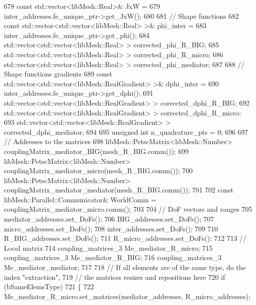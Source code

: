 \begin{DoxyCode}
678         \textcolor{keyword}{const} std::vector<libMesh::Real>& JxW =
679                 inter\_addresses.fe\_unique\_ptr->get\_JxW();
680 
681         \textcolor{comment}{// Shape functions}
682         \textcolor{keyword}{const} std::vector<std::vector<libMesh::Real> >& phi\_inter =
683                 inter\_addresses.fe\_unique\_ptr->get\_phi();
684         std::vector<std::vector<libMesh::Real> > corrected\_phi\_R\_BIG;
685         std::vector<std::vector<libMesh::Real> > corrected\_phi\_R\_micro;
686         std::vector<std::vector<libMesh::Real> > corrected\_phi\_mediator;
687 
688         \textcolor{comment}{// Shape functions gradients}
689         \textcolor{keyword}{const} std::vector<std::vector<libMesh::RealGradient> >& dphi\_inter =
690                 inter\_addresses.fe\_unique\_ptr->get\_dphi();
691         std::vector<std::vector<libMesh::RealGradient> > corrected\_dphi\_R\_BIG;
692         std::vector<std::vector<libMesh::RealGradient> > corrected\_dphi\_R\_micro;
693         std::vector<std::vector<libMesh::RealGradient> > corrected\_dphi\_mediator;
694 
695         \textcolor{keywordtype}{unsigned} \textcolor{keywordtype}{int} n\_quadrature\_pts = 0;
696 
697         \textcolor{comment}{// Addresses to the matrices}
698         libMesh::PetscMatrix<libMesh::Number> couplingMatrix\_mediator\_BIG(mesh\_R\_BIG.comm());
699         libMesh::PetscMatrix<libMesh::Number> couplingMatrix\_mediator\_micro(mesh\_R\_BIG.comm());
700         libMesh::PetscMatrix<libMesh::Number> couplingMatrix\_mediator\_mediator(mesh\_R\_BIG.comm());
701 
702         \textcolor{keyword}{const} libMesh::Parallel::Communicator& WorldComm = couplingMatrix\_mediator\_micro.comm();
703 
704         \textcolor{comment}{// DoF vectors and ranges}
705         mediator\_addresses.set\_DoFs();
706         BIG\_addresses.set\_DoFs();
707         micro\_addresses.set\_DoFs();
708         inter\_addresses.set\_DoFs();
709 
710         R\_BIG\_addresses.set\_DoFs();
711         R\_micro\_addresses.set\_DoFs();
712 
713         \textcolor{comment}{// Local matrix}
714         coupling\_matrices\_3 Me\_mediator\_R\_micro;
715         coupling\_matrices\_3 Me\_mediator\_R\_BIG;
716         coupling\_matrices\_3 Me\_mediator\_mediator;
717 
718         \textcolor{comment}{//    If all elements are of the same type, do the index "extraction",}
719         \textcolor{comment}{// the matrices resizes and repositions here}
720         \textcolor{keywordflow}{if} (bSameElemsType)
721         \{
722             Me\_mediator\_R\_micro.set\_matrices(mediator\_addresses, R\_micro\_addresses);

\end{DoxyCode}
